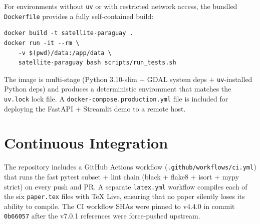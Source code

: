 For environments without \texttt{uv} or with restricted network
access, the bundled \texttt{Dockerfile} provides a fully
self-contained build:

\begin{verbatim}
docker build -t satellite-paraguay .
docker run -it --rm \
    -v $(pwd)/data:/app/data \
    satellite-paraguay bash scripts/run_tests.sh
\end{verbatim}

The image is multi-stage (Python 3.10-slim + GDAL system deps +
\texttt{uv}-installed Python deps) and produces a deterministic
environment that matches the \texttt{uv.lock} lock file. A
\texttt{docker-compose.production.yml} file is included for
deploying the FastAPI + Streamlit demo to a remote host.

\section{Continuous Integration}

The repository includes a GitHub Actions workflow
(\texttt{.github/workflows/ci.yml}) that runs the fast pytest subset
+ lint chain (black + flake8 + isort + mypy strict) on every push
and PR. A separate \texttt{latex.yml} workflow compiles each of the
six \texttt{paper.tex} files with TeX Live, ensuring that no paper
silently loses its ability to compile. The CI workflow SHAs were
pinned to v4.4.0 in commit \texttt{0b66057} after the v7.0.1
references were force-pushed upstream.

